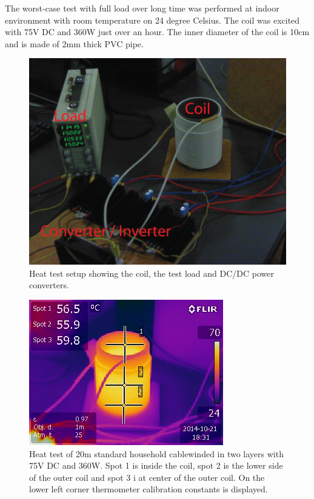 \noindent
The worst-case test with full load over long time was performed at indoor environment with room temperature on 24 degree Celsius. The coil was excited with 75V DC and 360W just over an hour. The inner diameter of the coil is 10cm and is made of 2mm thick PVC pipe.

\begin{figure}[H]
   \centering
   \includegraphics[scale=0.5]{graphics/heat_test/heat_test_setup.png}
   \caption{Heat test setup showing the coil, the test load and DC/DC power converters.}
   \end{figure}
      

\begin{figure}[H]
\centering
\includegraphics[scale=1]{graphics/heat_test/IR_1491.jpg}
\caption[Heat test, image from thermal camera]{Heat test of 20m standard household cable\footnotemark winded in two layers with 75V DC and 360W. Spot 1 is inside the coil, spot 2 is the lower side of the outer coil and spot 3 i at center of the outer coil. On the lower left corner thermometer calibration constants is displayed.}
\label{fig:heat_test_ir}
\end{figure}

